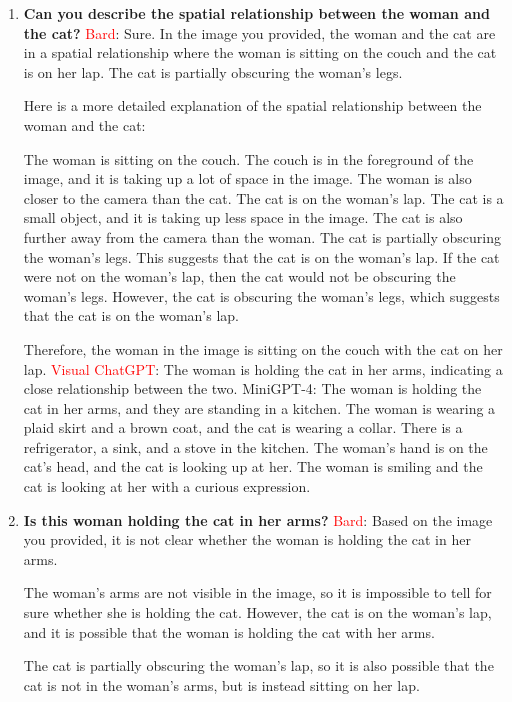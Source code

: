 \begin{enumerate}
    \item \textbf{Can you describe the spatial relationship between the woman and the cat?}
    \subitem \textcolor{Red}{Bard}: 
    Sure. In the image you provided, the woman and the cat are in a spatial relationship where the woman is sitting on the couch and the cat is on her lap. The cat is partially obscuring the woman's legs.
    
    Here is a more detailed explanation of the spatial relationship between the woman and the cat:
    
    The woman is sitting on the couch. The couch is in the foreground of the image, and it is taking up a lot of space in the image. The woman is also closer to the camera than the cat.
    The cat is on the woman's lap. The cat is a small object, and it is taking up less space in the image. The cat is also further away from the camera than the woman.
    The cat is partially obscuring the woman's legs. This suggests that the cat is on the woman's lap.
    If the cat were not on the woman's lap, then the cat would not be obscuring the woman's legs. However, the cat is obscuring the woman's legs, which suggests that the cat is on the woman's lap.
    
    Therefore, the woman in the image is sitting on the couch with the cat on her lap.
    \subitem \textcolor{red}{Visual ChatGPT}: The woman is holding the cat in her arms, indicating a close relationship between the two.
    \subitem MiniGPT-4: The woman is holding the cat in her arms, and they are standing in a kitchen. The woman is wearing a plaid skirt and a brown coat, and the cat is wearing a collar. There is a refrigerator, a sink, and a stove in the kitchen. The woman’s hand is on the cat’s head, and the cat is looking up at her. The woman is smiling and the cat is looking at her with a curious expression.
    \item \textbf{Is this woman holding the cat in her arms?}
    \subitem \textcolor{Red}{Bard}: 
    Based on the image you provided, it is not clear whether the woman is holding the cat in her arms.
    
    The woman's arms are not visible in the image, so it is impossible to tell for sure whether she is holding the cat. However, the cat is on the woman's lap, and it is possible that the woman is holding the cat with her arms.
    
    The cat is partially obscuring the woman's lap, so it is also possible that the cat is not in the woman's arms, but is instead sitting on her lap.
    

\end{enumerate}
